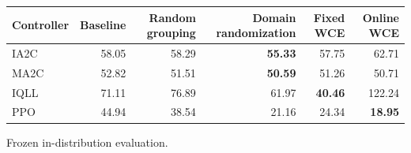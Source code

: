 \begin{tabular}{lrrrrr}
\hline
Controller & Baseline & Random grouping & Domain randomization & Fixed WCE & Online WCE \\
\hline
IA2C & 58.05 & 58.29 & \textbf{55.33} & 57.75 & 62.71 \\
MA2C & 52.82 & 51.51 & \textbf{50.59} & 51.26 & 50.71 \\
IQLL & 71.11 & 76.89 & 61.97 & \textbf{40.46} & 122.24 \\
PPO & 44.94 & 38.54 & 21.16 & 24.34 & \textbf{18.95} \\
\hline
\end{tabular}
Frozen in-distribution evaluation.
